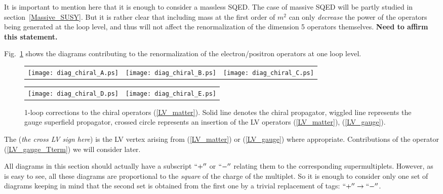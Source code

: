 \documentclass[a4paper,12pt]{article}
\begin{document}
	It is important to mention here that it is enough to
	consider a massless SQED.
	The case of massive SQED will be partly studied in 
	section~\ref{Massive_SUSY}.
	But it is rather clear 
	that including mass at the first order of $ m^2 $
	can only {\it decrease} the power of the operators being
	generated at the loop level, and thus will not affect
	the renormalization of the dimension 5 operators themselves.
	{\bf Need to affirm this statement.}

Fig.~\ref{diag_LV_chiral}
	shows the diagrams contributing to the renormalization
	of the electron/positron operators at one loop level.
\begin{figure}[h]
\caption{\label{diag_LV_chiral}
        1-loop corrections to the
	chiral operators (\ref{LV_matter}). 
	Solid line denotes the chiral propagator, wiggled line
	represents the gauge superfield propagator, crossed circle
	represents an insertion of the LV operators
	(\ref{LV_matter}), (\ref{LV_gauge}).
}
\begin{center}
\begin{tabular}{ccc}
\texttt{[image: diag\_chiral\_A.ps]}
&
\texttt{[image: diag\_chiral\_B.ps]}
&
\texttt{[image: diag\_chiral\_C.ps]} 
\end{tabular}

\begin{tabular}{rl}
\texttt{[image: diag\_chiral\_D.ps]}
&
\texttt{[image: diag\_chiral\_E.ps]}
\end{tabular}
\end{center}
\end{figure}

	The ({\it the cross LV sign here}) is the LV vertex arising 
	from (\ref{LV_matter}) or (\ref{LV_gauge}) where appropriate.
	Contributions of the operator (\ref{LV_gauge_Tterm}) we will
	consider later. 

	All diagrams in this section should actually have a subscript
	$ ``+'' $ or $ ``-'' $ 
	relating them to the corresponding supermultiplets.
	However, as is easy to see, all these diagrams are proportional
	to the {\it square} of the charge of the multiplet.
	So it is enough to consider only one set of diagrams keeping in 
	mind that the second set is obtained from the first one by a 
	trivial replacement of tags: $ ``+'' \to ``-'' $. 
\end{document}
